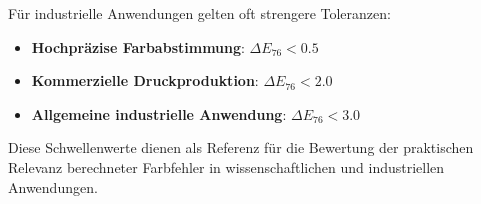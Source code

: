 Für industrielle Anwendungen gelten oft strengere Toleranzen:

\begin{itemize}
    \item \textbf{Hochpräzise Farbabstimmung}: $\Delta E_{76} < 0.5$
    \item \textbf{Kommerzielle Druckproduktion}: $\Delta E_{76} < 2.0$
    \item \textbf{Allgemeine industrielle Anwendung}: $\Delta E_{76} < 3.0$
\end{itemize}

Diese Schwellenwerte dienen als Referenz für die Bewertung der praktischen Relevanz berechneter Farbfehler in wissenschaftlichen und industriellen Anwendungen.